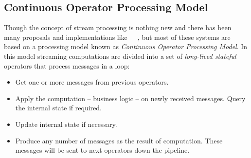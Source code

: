 \subsection{Continuous Operator Processing Model}
\label{sp:continues-model}

Though the concept of stream processing is nothing new and there has been many proposals and implementations like~\cite{Grandl:2014:MPC}~\cite{Storm}~\cite{flink}, but most of these systems are based on a processing model known as \emph{Continuous Operator Processing Model}. In this model streaming computations are divided into a set of \emph{long-lived stateful} operators that process messages in a loop:
\begin{itemize}
    \item Get one or more messages from previous operators.
    \item Apply the computation -- business logic -- on newly received messages. Query the internal state if required.
    \item Update internal state if necessary.
    \item Produce any number of messages as the result of computation. These messages will be sent to next operators down the pipeline.
\end{itemize}

